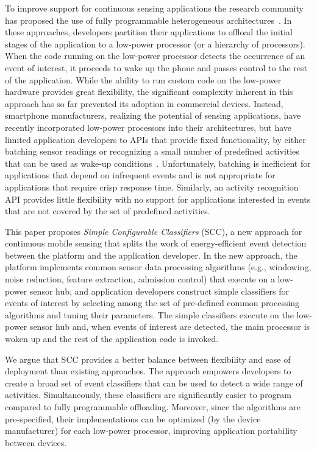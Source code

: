 To improve support for continuous sensing applications the research
community has proposed the use of fully progra\-mmable heterogeneous
architectures~\cite{reflex,littlerock,turducken}.  In these
approaches, developers partition their applications to offload the
initial stages of the application to a low-power processor (or a
hierarchy of processors).  When the code running on the low-power
processor detects the occurrence of an event of interest, it proceeds
to wake up the phone and passes control to the rest of the
application.  While the ability to run custom code on the low-power
hardware provides great flexibility, the significant complexity
inherent in this approach has so far prevented its adoption in
commercial devices.  Instead, smartphone manufacturers, realizing the
potential of sensing applications, have recently incorporated
low-power processors into their architectures, but have limited
application developers to APIs that provide fixed functionality, by
either batching sensor readings or recognizing a small number of
predefined activities that can be used as wake-up
conditions~\cite{androidMotionSensors,coreMotion,x8mobile}.
Unfortunately, batching is inefficient for applications that depend on
infrequent events and is not appropriate for applications that require
crisp response time.  Similarly, an activity recognition API provides
little flexibility with no support for applications interested in
events that are not covered by the set of predefined activities.

This paper proposes {\em Simple Configurable Classifiers} (SCC), a new
approach for continuous mobile sensing that splits the work of
energy-efficient event detection between the platform and the
application developer.  In the new approach, the platform implements
common sensor data processing algorithms (e.g., windowing, noise 
reduction, feature extraction, admission control) that execute on a 
low-power sensor hub, and application developers construct simple 
classifiers for events of interest by selecting among the set of
pre-defined common processing algorithms and tuning their
parameters.  The simple classifiers execute on the
low-power sensor hub and, when events of interest are detected, the
main processor is woken up and the rest of the application code is
invoked.
  
We argue that SCC provides a better
balance between flexibility and ease of deployment than existing
approaches.  The approach empowers developers to create a broad set of
event classifiers that can be used to detect a wide range of
activities.  Simultaneously, these classifiers are significantly
easier to program compared to fully programmable offloading.
Moreover, since the algorithms are pre-specified, their
implementations can be optimized (by the device manufacturer) for each
low-power processor, improving application portability between
devices.  

